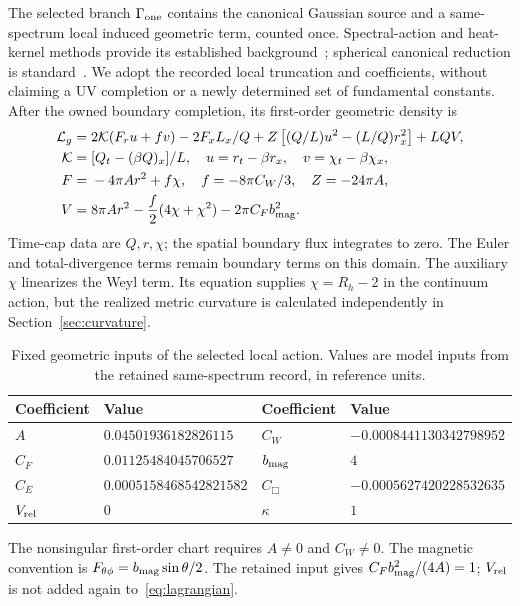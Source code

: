 \documentclass[11pt]{article}
\begin{document}
The selected branch $\Gamma_{\rm one}$ contains the canonical Gaussian
source and a same-spectrum local induced geometric term, counted once.
Spectral-action and heat-kernel methods provide its established
background~\cite{ChamseddineConnes1997,Vassilevich2003}; spherical canonical
reduction is standard~\cite{GrumillerKummerVassilevich2002}. We adopt the
recorded local truncation and coefficients, without claiming a UV completion
or a newly determined set of fundamental constants. After the owned
boundary completion, its first-order geometric density is
\begin{align}\label{eq:lagrangian}
\mathcal L_g={}&2\mathcal K(F_r u+fv)-2F_xL_x/Q
 +Z\left[(Q/L)u^2-(L/Q)r_x^2\right]+LQV,\\
\mathcal K={}&[Q_t-(\beta Q)_x]/L,\quad
u=r_t-\beta r_x,\quad v=\chi_t-\beta\chi_x,\nonumber\\
F={}&-4\pi A r^2+f\chi,\quad f=-8\pi C_W/3,\quad Z=-24\pi A,\nonumber\\
V={}&8\pi A r^2-\frac f2(4\chi+\chi^2)-2\pi C_F b_{\rm mag}^2.\nonumber
\end{align}
Time-cap data are $Q,r,\chi$; the spatial boundary flux integrates to zero.
The Euler and total-divergence terms remain boundary terms on this domain.
The auxiliary $\chi$ linearizes the Weyl term. Its equation supplies
$\chi=R_h-2$ in the continuum action, but the realized metric curvature is
calculated independently in Section~\ref{sec:curvature}.

\begin{table}[tbp]
\centering
\caption{Fixed geometric inputs of the selected local action. Values are
model inputs from the retained same-spectrum record, in reference units.}
\label{tab:inputs}
\begin{tabular}{ll@{\qquad}ll}
\toprule
Coefficient & Value & Coefficient & Value\\
\midrule
$A$ & $0.04501936182826115$ & $C_W$ & $-0.0008441130342798952$\\
$C_F$ & $0.01125484045706527$ & $b_{\rm mag}$ & $4$\\
$C_E$ & $0.0005158468542821582$ & $C_{\Box}$ & $-0.0005627420228532635$\\
$V_{\rm rel}$ & $0$ & $\kappa$ & $1$\\
\bottomrule
\end{tabular}
\end{table}
The nonsingular first-order chart requires $A\ne0$ and $C_W\ne0$.
The magnetic convention is $F_{\theta\phi}=b_{\rm mag}\sin\theta/2$.
The retained input gives $C_Fb_{\rm mag}^2/(4A)=1$; $V_{\rm rel}$ is not
added again to~\eqref{eq:lagrangian}.
\end{document}
